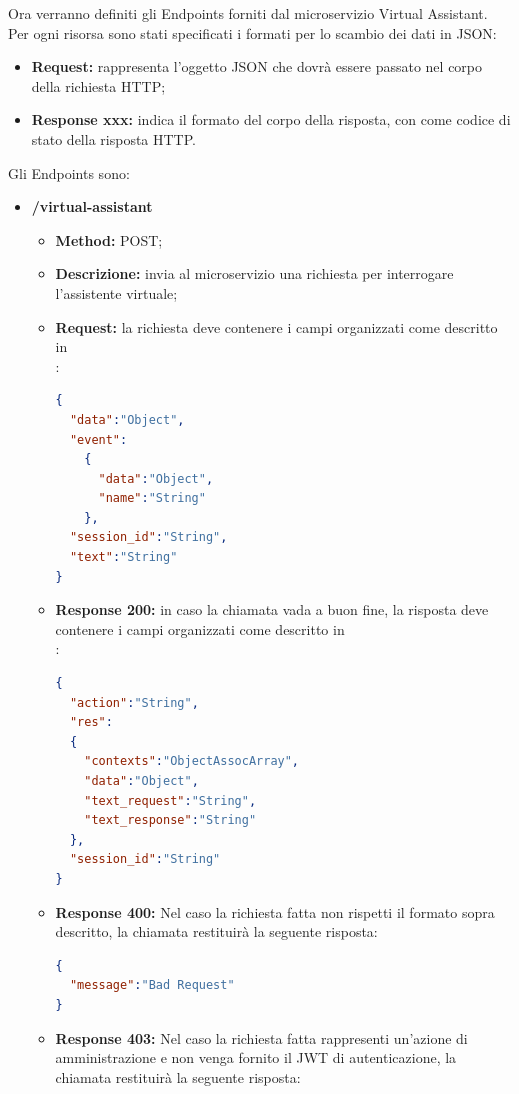 Ora verranno definiti gli Endpoints forniti dal microservizio Virtual Assistant.\\
Per ogni risorsa sono stati specificati i formati per lo scambio dei dati in JSON:
\begin{itemize}
\item \textbf{Request:} rappresenta l’oggetto JSON che dovrà essere passato nel corpo della richiesta HTTP;
\item \textbf{Response xxx:} indica il formato del corpo della risposta, con  come codice di stato della risposta HTTP.
\end{itemize}
Gli Endpoints sono:
\begin{itemize}
\item \textbf{/virtual-assistant}\\
\begin{itemize}
\item \textbf{Method:} POST;
\item \textbf{Descrizione:} invia al microservizio una richiesta per interrogare l'assistente virtuale;
\item \textbf{Request:} la richiesta deve contenere i campi organizzati come descritto in \\:
\begin{lstlisting}[language=json,firstnumber=1]
{
  "data":"Object",
  "event":
    {
      "data":"Object",
      "name":"String"
    },
  "session_id":"String",
  "text":"String"
}
\end{lstlisting}
\item \textbf{Response 200:} in caso la chiamata vada a buon fine, la risposta deve contenere i campi organizzati come descritto in \\:
\begin{lstlisting}[language=json,firstnumber=1]
{
  "action":"String",
  "res":
  {
    "contexts":"ObjectAssocArray",
    "data":"Object",
    "text_request":"String",
    "text_response":"String"
  },
  "session_id":"String"
}
\end{lstlisting}
\item \textbf{Response 400:} Nel caso la richiesta fatta non rispetti il formato sopra descritto, la chiamata restituirà la seguente risposta:
\begin{lstlisting}[language=json,firstnumber=1]
{
  "message":"Bad Request"
}
\end{lstlisting}
\item \textbf{Response 403:} Nel caso la richiesta fatta rappresenti un'azione di amministrazione e non venga fornito il JWT di autenticazione, la chiamata restituirà la seguente risposta:

\end{itemize}
\end{itemize}
